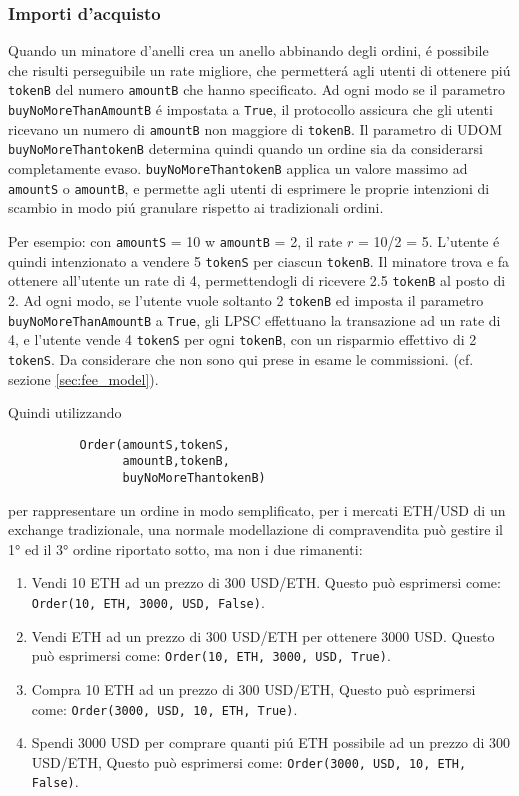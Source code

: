 \documentclass[UTF8,nofonts]{article}
\begin{document}
\begin{multicols}{2}
\subsubsection{Importi d'acquisto}

Quando un minatore d'anelli crea  un anello abbinando degli ordini, \'e possibile che risulti perseguibile un rate migliore, che permetter\'a agli utenti di ottenere pi\'u \verb|tokenB| del numero \verb|amountB| che hanno specificato.  Ad ogni modo se il parametro \verb|buyNoMoreThanAmountB| \'e impostata a \verb|True|, il protocollo assicura che gli utenti ricevano un numero di \verb|amountB| non maggiore di \verb|tokenB|. Il parametro di UDOM \verb|buyNoMoreThantokenB| determina quindi quando un ordine sia da considerarsi completamente evaso. \verb|buyNoMoreThantokenB| applica un valore massimo ad \verb|amountS| o \verb|amountB|, e permette agli utenti di esprimere le proprie intenzioni di scambio in modo pi\'u granulare rispetto ai tradizionali ordini.

Per esempio: con  \verb|amountS| = 10 w \verb|amountB| = 2, il  rate $r$ = 10/2 = 5. L'utente \'e quindi intenzionato a vendere 5 \verb|tokenS| per ciascun \verb|tokenB|. Il minatore trova e fa ottenere all'utente un rate di 4, permettendogli di ricevere 2.5 \verb|tokenB| al posto di 2. Ad ogni modo, se l'utente vuole soltanto 2 \verb|tokenB| ed imposta il parametro \verb|buyNoMoreThanAmountB| a \verb|True|, gli LPSC effettuano la transazione ad un rate di 4, e l'utente vende 4 \verb|tokenS| per ogni \verb|tokenB|, con un risparmio effettivo di 2 \verb|tokenS|. Da considerare che non sono qui prese in esame le commissioni. (cf. sezione \ref{sec:fee_model}).

Quindi utilizzando


\begin{verbatim}
	      Order(amountS,tokenS,
	            amountB,tokenB,
	            buyNoMoreThantokenB)
\end{verbatim}

per rappresentare un ordine in modo semplificato, per i mercati ETH/USD di un exchange tradizionale, una normale modellazione di compravendita può gestire il 1° ed il 3° ordine riportato sotto, ma non i due rimanenti:

\begin{enumerate}
	\item Vendi 10 ETH ad un prezzo di 300 USD/ETH. Questo può esprimersi come: \verb|Order(10, ETH, 3000, USD, False)|.
	\item Vendi  ETH  ad un prezzo di 300  USD/ETH  per ottenere  3000  USD.  Questo può esprimersi come: \verb|Order(10, ETH, 3000, USD, True)|.
	\item Compra 10 ETH ad un prezzo di 300 USD/ETH, Questo può esprimersi come: \verb|Order(3000, USD, 10, ETH, True)|.
	\item Spendi 3000  USD  per comprare quanti pi\'u  ETH possibile ad un prezzo di 300  USD/ETH,  Questo può esprimersi come: \verb|Order(3000, USD, 10, ETH, False)|.
\end{enumerate}




\end{multicols}
\end{document}
